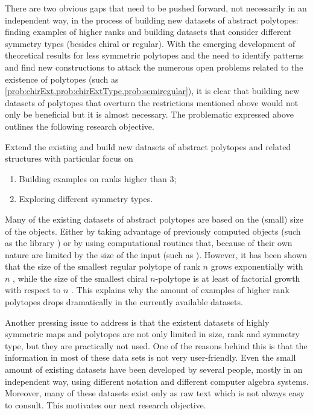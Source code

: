 \documentclass[a4paper,12pt,english]{article}
\begin{document}
There are two obvious gaps that need to be pushed forward, not necessarily in an independent way, in the process of building new datasets of abstract polytopes: finding examples of higher ranks and building datasets that consider different symmetry types (besides chiral or regular).
With the emerging development of theoretical results for less symmetric polytopes and the need to identify patterns and find new constructions to attack the numerous open problems related to the existence of polytopes (such as \cref{prob:chirExt,prob:chirExtType,prob:semiregular}), it is clear that building new datasets of polytopes that overturn the restrictions mentioned above would not only be beneficial but it is almost necessary.
The problematic expressed above outlines the following research objective.

\begin{obj}\label{obj:datasets}
  Extend the existing and build new datasets of abstract polytopes and related structures with particular focus on
  \begin{enumerate}[label=\textit{(\roman*)}, noitemsep]
    \item Building examples on ranks higher than $3$;
    \item Exploring different symmetry types.
  \end{enumerate}
\end{obj}

Many of the existing datasets of abstract polytopes are based on the (small) size of the objects.
Either by taking advantage of previously computed objects (such as the library \smallgrp{}) or by using computational routines that, because of their own nature are limited by the size of the input (such as  \lins).
However, it has been shown that the size of the smallest regular polytope of rank $n$ grows exponentially with $n$ \cite{Conder2013_SmallestRegularPolytopes}, while the size of the smallest chiral $n$-polytope is at least of factorial growth with respect to $n$ \cite{Cunningham2017_NonFlatRegular}.
This explains why the amount of examples of higher rank polytopes drops dramatically in the currently available datasets.

Another pressing issue to address is that the existent datasets of highly symmetric maps and polytopes are not only limited in size, rank and symmetry type, but they are practically not used.
One of the reasons behind this is that the information in most of these data sets is not very user-friendly.
Even the small amount of existing datasets have been developed by several people, mostly in an independent way, using different notation and different computer algebra systems.
Moreover, many of these datasets exist only as raw text which is not always easy to consult.
This motivates our next research objective.
\end{document}
